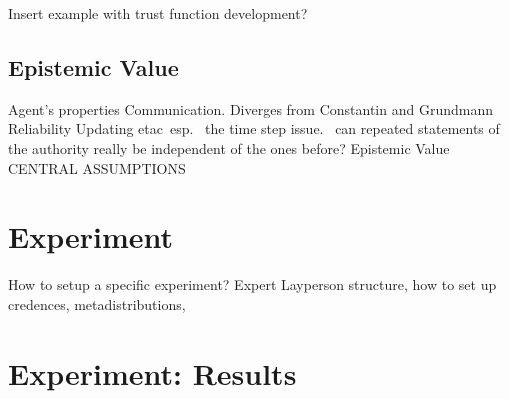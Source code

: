 \documentclass[11pt, a4paper]{article}
\begin{document}
Insert example with trust function development?

\subsection{Epistemic Value}





Agent's properties
Communication. Diverges from Constantin and Grundmann
Reliability
Updating etac\
esp. \ the time step issue. \ can repeated statements of the authority really be independent of the ones before?
Epistemic Value
CENTRAL ASSUMPTIONS

\section{Experiment}
How to setup a specific experiment? Expert Layperson structure, how to set up credences, metadistributions, 

\section{Experiment: Results}

\nocite{*}
\printbibliography{}
\end{document}
